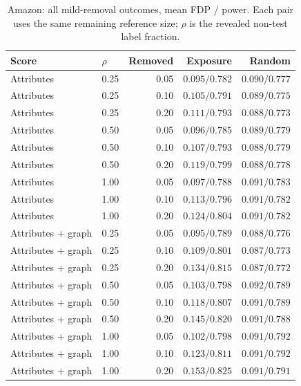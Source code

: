 \begin{table}[ht]\centering\small
\caption{Amazon: all mild-removal outcomes, mean FDP / power. Each pair uses the same remaining reference size; $\rho$ is the revealed non-test label fraction.}
\begin{tabular}{llrrr}\toprule Score & $\rho$ & Removed & Exposure & Random\\\midrule
Attributes & 0.25 & 0.05 & $0.095/0.782$ & $0.090/0.777$ \\
Attributes & 0.25 & 0.10 & $0.105/0.791$ & $0.089/0.775$ \\
Attributes & 0.25 & 0.20 & $0.111/0.793$ & $0.088/0.773$ \\
Attributes & 0.50 & 0.05 & $0.096/0.785$ & $0.089/0.779$ \\
Attributes & 0.50 & 0.10 & $0.107/0.793$ & $0.088/0.779$ \\
Attributes & 0.50 & 0.20 & $0.119/0.799$ & $0.088/0.778$ \\
Attributes & 1.00 & 0.05 & $0.097/0.788$ & $0.091/0.783$ \\
Attributes & 1.00 & 0.10 & $0.113/0.796$ & $0.091/0.782$ \\
Attributes & 1.00 & 0.20 & $0.124/0.804$ & $0.091/0.782$ \\
Attributes + graph & 0.25 & 0.05 & $0.095/0.789$ & $0.088/0.776$ \\
Attributes + graph & 0.25 & 0.10 & $0.109/0.801$ & $0.087/0.773$ \\
Attributes + graph & 0.25 & 0.20 & $0.134/0.815$ & $0.087/0.772$ \\
Attributes + graph & 0.50 & 0.05 & $0.103/0.798$ & $0.092/0.789$ \\
Attributes + graph & 0.50 & 0.10 & $0.118/0.807$ & $0.091/0.789$ \\
Attributes + graph & 0.50 & 0.20 & $0.145/0.820$ & $0.091/0.788$ \\
Attributes + graph & 1.00 & 0.05 & $0.102/0.798$ & $0.091/0.792$ \\
Attributes + graph & 1.00 & 0.10 & $0.123/0.811$ & $0.091/0.792$ \\
Attributes + graph & 1.00 & 0.20 & $0.153/0.825$ & $0.091/0.791$ \\
\bottomrule\end{tabular}\end{table}
